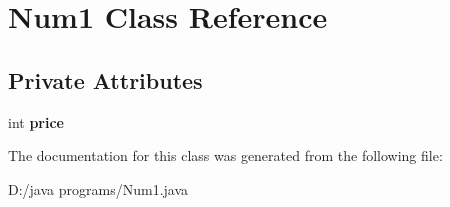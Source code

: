 \hypertarget{class_num1}{}\section{Num1 Class Reference}
\label{class_num1}
\subsection*{Private Attributes}
\begin{DoxyCompactItemize}
\item 
\mbox{\label{class_num1_a1e3472e6d87bfeac0c648e214a8b3e86}} 
int {\bfseries price}
\end{DoxyCompactItemize}


The documentation for this class was generated from the following file\+:\begin{DoxyCompactItemize}
\item 
D\+:/java programs/Num1.\+java\end{DoxyCompactItemize}
